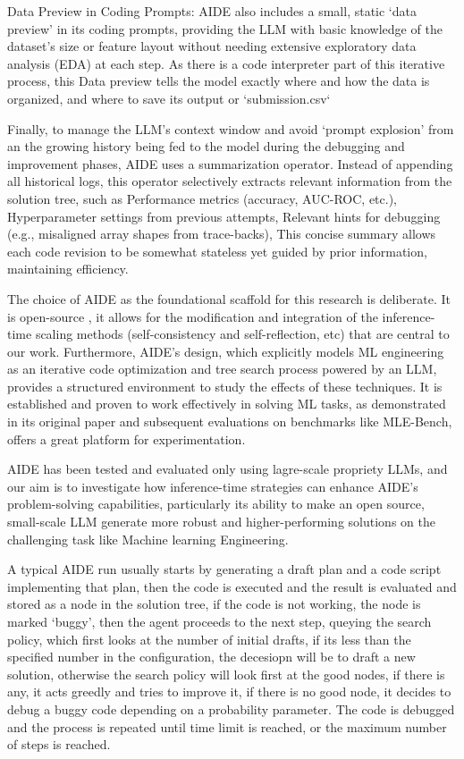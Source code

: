 Data Preview in Coding Prompts: AIDE also includes a small, static `data preview' in its coding prompts, providing the LLM with basic knowledge of the dataset's size or feature layout without needing extensive exploratory data analysis (EDA) at each step. As there is a code interpreter part of this iterative process, this Data preview tells the model exactly where and how the data is organized, and where to save its output or `submission.csv`

Finally, to manage the LLM's context window and avoid `prompt explosion' from an  the growing history being fed to the model during the debugging and improvement phases, AIDE uses a summarization operator. Instead of appending all historical logs, this operator selectively extracts relevant information from the solution tree, such as Performance metrics (accuracy, AUC-ROC, etc.), Hyperparameter settings from previous attempts, Relevant hints for debugging (e.g., misaligned array shapes from trace-backs), This concise summary allows each code revision to be somewhat stateless yet guided by prior information, maintaining efficiency.

The choice of AIDE as the foundational scaffold for this research is deliberate. It is open-source , it allows for the modification and integration of the inference-time scaling methods (self-consistency and self-reflection, etc) that are central to our work. Furthermore, AIDE's design, which explicitly models ML engineering as an iterative code optimization and tree search process powered by an LLM, provides a structured environment to study the effects of these techniques. It is established and proven to work effectively in solving ML tasks, as demonstrated in its original paper and subsequent evaluations on benchmarks like MLE-Bench, offers a great platform for experimentation. 

AIDE has been tested and evaluated only using lagre-scale propriety LLMs, and our aim is to investigate how inference-time strategies can enhance AIDE's problem-solving capabilities, particularly its ability to make an open source, small-scale LLM generate more robust and higher-performing solutions on the challenging task like Machine learning Engineering.

A typical AIDE run usually starts by generating a draft plan and a code script implementing that plan, then the code is executed and the result is evaluated and stored as a node in the solution tree, if the code is not working, the node is marked `buggy', then the agent proceeds to the next step, queying the search policy, which first looks at the number of initial drafts, if its less than the specified number in the configuration, the decesiopn will be to draft a new solution, otherwise the search policy will look first at the good nodes, if there is any, it acts greedly and tries to improve it, if there is no good node, it decides to debug a buggy code depending on a probability parameter. The code is debugged and the process is repeated until time limit is reached, or the maximum number of steps is reached.


